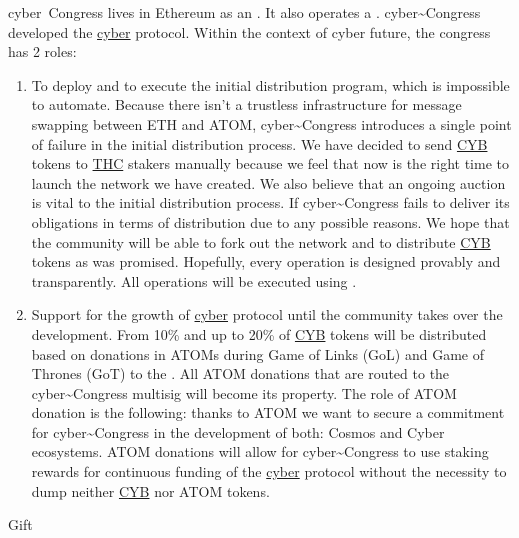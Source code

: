 \documentclass[8pt,oneside]{amsart}
\makeatletter
\newcommand{\linkgreen}[2]{\href{#1}{\color{green}{#2}}}
\renewcommand\subsection{\@startsection{subsection}
                                    {2}{\z@}
                                    {-3.25ex\@plus -1ex \@minus -.2ex}
                                    {0ex \@plus .2ex}
                                    {\play\Large}
                        }
\newcommand{\titleSection}[1]{\subsection{#1}}
\makeatother
\begin{document}
cyber~Congress lives in Ethereum as an \linkgreen{https://mainnet.aragon.org/#/cybercongress/0x4feb2bcc5907e7779130c093eef8fb44502c1330/}{Aragon DAO}. It also operates a \linkgreen{https://cyberd.ai/account/cyber1809vlaew5u5p24tvmse9kvgytwwr3ej7txe7p6}{2-of-3 multisig in Cyber network}. cyber\~{}Congress developed the {\hyperref[cyber]{cyber}} protocol. Within the context of cyber future, the congress has 2 roles:
\begin{enumerate}
 \item To deploy and to execute the initial distribution program, which is impossible to automate. Because there isn't a trustless infrastructure for message swapping between ETH and ATOM, cyber\~{}Congress introduces a single point of failure in the initial distribution process. We have decided to send {\hyperref[cyb]{CYB}} tokens to {\hyperref[thc]{THC}} stakers manually because we feel that now is the right time to launch the network we have created. We also believe that an ongoing auction is vital to the initial distribution process. If cyber\~{}Congress fails to deliver its obligations in terms of distribution due to any possible reasons. We hope that the community will be able to fork out the network and to distribute {\hyperref[cyb]{CYB}} tokens as was promised. Hopefully, every operation is designed provably and transparently. All operations will be executed using \linkgreen{https://cyberd.ai/account/cyber12v6jzx9vea277aqj0nffll8ewvme35w94yv258}{special purpose 2-of-3 multisig account in Cyber network}.
 \item Support for the growth of {\hyperref[cyber]{cyber}} protocol until the community takes over the development. From 10\% and up to 20\% of {\hyperref[cyb]{CYB}} tokens will be distributed based on donations in ATOMs during Game of Links (GoL) and Game of Thrones (GoT) to the \linkgreen{https://www.mintscan.io/account/cosmos1809vlaew5u5p24tvmse9kvgytwwr3ej7vd7kgq}{cyber\~{}Congress Cosmos 2-of-3 multisig}. All ATOM donations that are routed to the cyber\~{}Congress multisig will become its property. The role of ATOM donation is the following: thanks to ATOM we want to secure a commitment for cyber\~{}Congress in the development of both: Cosmos and Cyber ecosystems. ATOM donations will allow for cyber\~{}Congress to use staking rewards for continuous funding of the {\hyperref[cyber]{cyber}} protocol without the necessity to dump neither {\hyperref[cyb]{CYB}} nor ATOM tokens.
\end{enumerate}

\titleSection{Gift}\label{gift}
\end{document}
